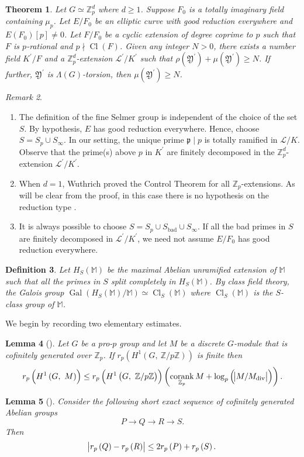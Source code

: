 \documentclass{amsart}
\DeclareMathOperator{\Gal}{Gal}
\DeclareMathOperator{\Cl}{Cl}
\DeclareMathOperator{\bad}{bad}
\DeclareMathOperator{\corank}{corank}
\DeclareMathOperator{\divisible}{div}
\newcommand{\FF}{\mathbb M}
\newcommand{\ZZ}{\mathbb Z}
\newcommand{\fp}{\mathfrak p}
\newcommand{\Linf}{\mathcal{L}}
\newcommand{\Y}{\mathfrak Y}
\newtheorem{Th}{Theorem}[section]
\newtheorem{Lemma}[Th]{Lemma}
\newtheorem{Defi}[Th]{Definition}
\theoremstyle{definition}
\theoremstyle{remark}
\newtheorem{rem}[Th]{Remark}
\begin{document}
\begin{Th}
\label{thm: fsg in general}
Let $G\simeq \ZZ_p^d$ where $d\geq 1$.
Suppose $F_0$ is a totally imaginary field containing $\mu_p$.
Let $E/F_0$ be an elliptic curve with good reduction everywhere and  $E(F_0)[p]\neq 0$.
Let $F/F_0$ be a cyclic extension of degree coprime to $p$ such that $F$ is $p$-rational and $p\nmid \Cl(F)$.
Given any integer $N>0$, there exists a number field $K^\prime/F$ and a $\ZZ_p^d$-extension $\Linf^\prime/K^\prime$ such that $\rho(\Y^\prime) + \mu(\Y^\prime) \geq N$.
If further, $\Y^\prime$ is $\Lambda(G)$-torsion, then $\mu(\Y^\prime) \geq N$.  
\end{Th}

\begin{rem}
\begin{enumerate}
\item The definition of the fine Selmer group is independent of the choice of the set $S$.
By hypothesis, $E$ has good reduction everywhere.
Hence, choose $S = S_p \cup S_\infty$.
In our setting, the unique prime $\fp \mid p$ is totally ramified in $\Linf/K$.
Observe that the prime(s) above $p$ in $K^\prime$ are finitely decomposed in the $\ZZ_p^d$-extension $\Linf^\prime/K^\prime$.
\item When $d=1$, Wuthrich proved the Control Theorem for all $\ZZ_p$-extensions.
As will be clear from the proof, in this case there is no hypothesis on the reduction type \cite{Kun20}.
\item It is always possible to choose $S=S_p \cup S_{\bad} \cup S_\infty$.
If all the bad primes in $S$ are finitely decomposed in $\Linf^\prime/K^\prime$, we need not assume $E/F_0$ has good reduction everywhere.
\end{enumerate}
\end{rem}

\begin{Defi}
Let $H_S(\FF)$ be the maximal Abelian unramified extension of $\FF$ such that all the primes in $S$ split completely in $H_S(\FF)$. 
By class field theory, the Galois group $\Gal\left(H_S(\FF)/\FF\right)\simeq \Cl_S(\FF)$ where $\Cl_S(\FF)$ is the $S$-class group of $\FF$.
\end{Defi}

We begin by recording two elementary estimates.
\begin{Lemma}[{\cite[Lemma 3.2]{LM15_CM}}]
\label{LM15_CM lemma 3.2}
Let $G$ be a pro-$p$ group and let $M$ be a discrete $G$-module that is cofinitely generated over $\ZZ_p$.
If $r_p\left(H^1\left(G, \ \ZZ/p\ZZ\right)\right)$ is finite then 
\[
r_p\left( H^1\left(G, \ M\right)\right) \leq r_p\left(H^1\left(G, \ \ZZ/p\ZZ\right)\right) \left( \corank_{\ZZ_p}M + \log_p\left( \abs{M/M_{\divisible}}\right)\right).
\]
\end{Lemma}
\begin{Lemma}[{\cite[Lemma 3.2]{LM15}}]
\label{lemma: repeated use in the following proof}
Consider the following short exact sequence of cofinitely generated Abelian groups
\[
P \rightarrow Q \rightarrow R \rightarrow S.
\]
Then
\[
\abs{ r_p\left( Q\right) - r_p\left( R\right)} \leq 2r_p\left(P\right) + r_p \left(S\right).
\]
\end{Lemma}
\end{document}
